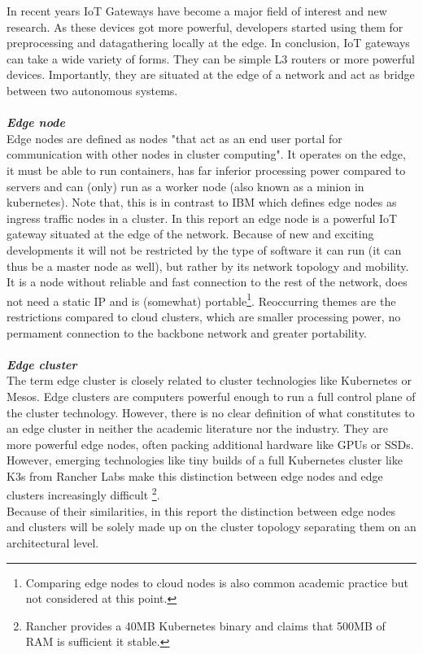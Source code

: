 In recent years IoT Gateways have become a major field of interest and new research. As these devices got more powerful, developers started using them for preprocessing and datagathering locally at the edge.
In conclusion, IoT gateways can take a wide variety of forms. They can be simple L3 routers or more powerful devices. Importantly, they are situated at the edge of a network and act as bridge between two autonomous systems.\\
\vspace*{0.5mm} \ \\
\textbf{\textit{Edge node}}\\
Edge nodes are defined as nodes "that act as an end user portal for communication with other
nodes in cluster computing"\cite{Whatised17:edgeNodeDef}.
It operates on the edge, it must be able to run containers, has far inferior processing power compared to servers and can (only) run as a worker node (also known as a minion in kubernetes)\cite{NodesKub7:edgeNodeMinion}. Note that, this is in contrast to IBM which defines edge nodes as ingress traffic nodes in a cluster\cite{IBMCloudEdgeNodes0:online}.
In this report an edge node is a powerful IoT gateway situated at the edge of the network. Because of new and exciting developments it will not be restricted by the type of software it can run (it can thus be a master node as well), but rather by its network topology and mobility. It is a node without reliable and fast connection to the rest of the network, does not need a static IP and is (somewhat) portable\footnote{Comparing edge nodes to cloud nodes is also common academic practice\cite{contstraintDevicesTerminology}  but not considered at this point.}.
Reoccurring themes are the restrictions compared to cloud clusters, which are smaller processing power,
no permament connection to the backbone network and greater portability.\\
\vspace{0.5mm} \ \\
\textbf{\textit{Edge cluster}}\\
The term edge cluster is closely related to cluster technologies like Kubernetes or Mesos.
Edge clusters are computers powerful enough to run a full control plane of the cluster technology.
However, there is no clear definition of what constitutes 
to an edge cluster in neither the academic literature nor the industry.
They are more powerful edge nodes, often packing additional hardware like GPUs or SSDs.
However, emerging technologies like tiny builds of a full Kubernetes cluster
like K3s from Rancher Labs\cite{k3sLight14:online} make this distinction 
between edge nodes and edge clusters
increasingly difficult
\footnote{Rancher provides a 40MB Kubernetes binary and claims that 500MB of RAM is sufficient 
it stable.}.\\
Because of their similarities, in this report the distinction between edge nodes and clusters will be solely
made up on the cluster topology separating them on an architectural level.

